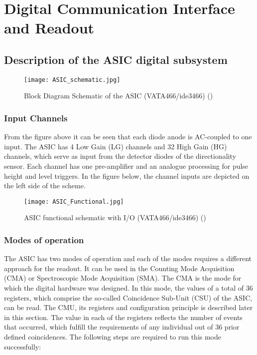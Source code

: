 \section{Digital Communication Interface and Readout}
\label{sec:logic_design}


\subsection{Description of the ASIC digital subsystem}
\label{sec:descriptionASIC}


\begin{figure}[H]
    \centering
    \texttt{[image: ASIC\_schematic.jpg]}
    \caption[]{Block Diagram Schematic of the ASIC (VATA466/ide3466) (\cite{Meier2016VATA466}) }
    \label{fig:ASIC_schematic}
\end{figure}

\subsubsection{Input Channels}

From the figure above it can be seen that each diode anode is AC-coupled to one input. The ASIC has 4 Low Gain (LG) channels and 32 High Gain (HG) channels, which serve as input from the detector diodes of the directionality sensor. Each channel has one pre-amplifier and an analogue processing for pulse height and level triggers. In the figure below, the channel inputs are depicted on the left side of the scheme.

\begin{figure}[H]
    \centering
    \texttt{[image: ASIC\_Functional.jpg]}
    \caption[]{ASIC functional schematic with I/O (VATA466/ide3466) (\cite{Meier2016VATA466}) }
    \label{fig:ASIC_Functional}
\end{figure}

\subsubsection{Modes of operation}

The ASIC has two modes of operation and each of the modes requires a different approach for the readout. It can be used in the Counting Mode Acquisition (CMA) or Spectroscopic Mode Acquisition (SMA). 
\newline
The CMA is the mode for which the digital hardware was designed. In this mode, the values of a total of 36 registers, which comprise the so-called Coincidence Sub-Unit (CSU) of the ASIC, can be read. The CMU, its registers and configuration principle is described later in this section. The value in each of the registers reflects the number of events that occurred, which fulfill the requirements of any individual out of 36 prior defined coincidences.
\newline
The following steps are required to run this mode successfully:





